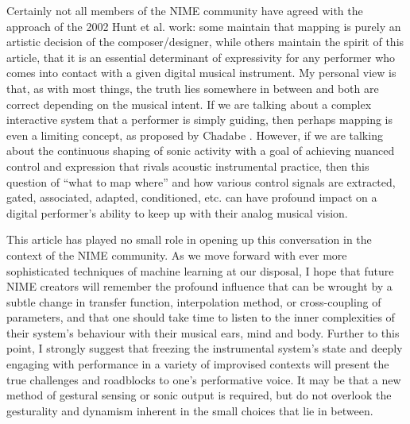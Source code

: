 Certainly not all members of the NIME community have agreed with the approach of the 2002 Hunt et al. work: some maintain that mapping is purely an artistic decision of the composer/designer, while others maintain the spirit of this article, that it is an essential determinant of expressivity for any performer who comes into contact with a given digital musical instrument. My personal view is that, as with most things, the truth lies somewhere in between and both are correct depending on the musical intent. If we are talking about a complex interactive system that a performer is simply guiding, then perhaps mapping is even a limiting concept, as proposed by Chadabe \cite{Chadabe:2002}. However, if we are talking about the continuous shaping of sonic activity with a goal of achieving nuanced control and expression that rivals acoustic instrumental practice, then this question of ``what to map where'' and how various control signals are extracted, gated, associated, adapted, conditioned, etc. can have profound impact on a digital performer's ability to keep up with their analog musical vision. 

This article has played no small role in opening up this conversation in the context of the NIME community. As we move forward with ever more sophisticated techniques of machine learning at our disposal, I hope that future NIME creators will remember the profound influence that can be wrought by a subtle change in transfer function, interpolation method, or cross-coupling of parameters, and that one should take time to listen to the inner complexities of their system's behaviour with their musical ears, mind and body. Further to this point, I strongly suggest that freezing the instrumental system's state and deeply engaging with performance in a variety of improvised contexts will present the true challenges and roadblocks to one's performative voice. It may be that a new method of gestural sensing or sonic output is required, but do not overlook the gesturality and dynamism inherent in the small choices that lie in between.  
